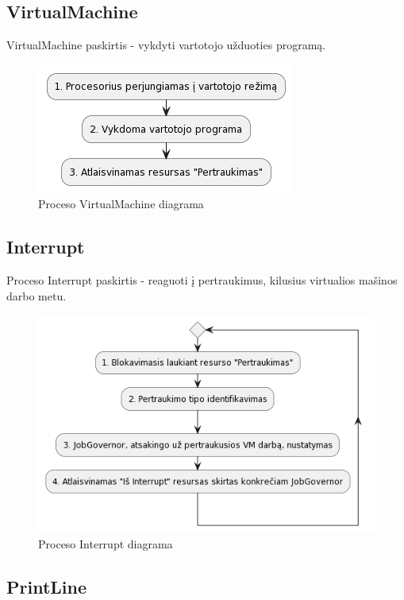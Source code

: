 \documentclass{VUMIFInfKursinis}
\begin{document}
\subsection{VirtualMachine}

VirtualMachine paskirtis - vykdyti vartotojo užduoties programą.

\begin{figure}[H]
	\centering	
	\includegraphics[scale=0.65]{img/VirtualMachine}
	\caption{Proceso VirtualMachine diagrama}   %
	\label{img:VirtualMachine}
\end{figure}

\subsection{Interrupt}

Proceso Interrupt paskirtis - reaguoti į pertraukimus, kilusius virtualios mašinos darbo metu.

\begin{figure}[H]
	\centering	
	\includegraphics[scale=0.65]{img/Interrupt}
	\caption{Proceso Interrupt diagrama}   %
	\label{img:Interrupt}
\end{figure}

\subsection{PrintLine}
\end{document}
